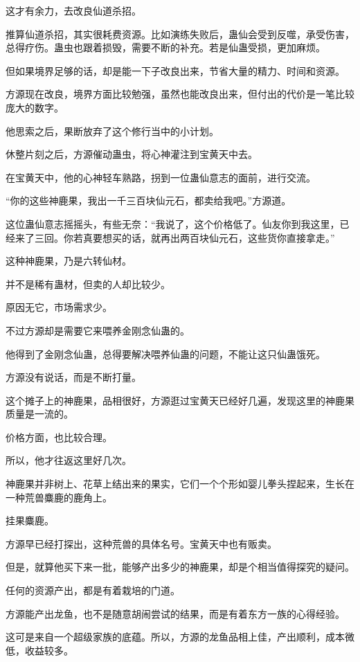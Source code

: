 \begin{this_body}
这才有余力，去改良仙道杀招。

推算仙道杀招，其实很耗费资源。比如演练失败后，蛊仙会受到反噬，承受伤害，总得疗伤。蛊虫也跟着损毁，需要不断的补充。若是仙蛊受损，更加麻烦。

但如果境界足够的话，却是能一下子改良出来，节省大量的精力、时间和资源。

方源现在改良，境界方面比较勉强，虽然也能改良出来，但付出的代价是一笔比较庞大的数字。

他思索之后，果断放弃了这个修行当中的小计划。

休整片刻之后，方源催动蛊虫，将心神灌注到宝黄天中去。

在宝黄天中，他的心神轻车熟路，拐到一位蛊仙意志的面前，进行交流。

“你的这些神鹿果，我出一千三百块仙元石，都卖给我吧。”方源道。

这位蛊仙意志摇摇头，有些无奈：“我说了，这个价格低了。仙友你到我这里，已经来了三回。你若真要想买的话，就再出两百块仙元石，这些货你直接拿走。”

这种神鹿果，乃是六转仙材。

并不是稀有蛊材，但卖的人却比较少。

原因无它，市场需求少。

不过方源却是需要它来喂养金刚念仙蛊的。

他得到了金刚念仙蛊，总得要解决喂养仙蛊的问题，不能让这只仙蛊饿死。

方源没有说话，而是不断打量。

这个摊子上的神鹿果，品相很好，方源逛过宝黄天已经好几遍，发现这里的神鹿果质量是一流的。

价格方面，也比较合理。

所以，他才往返这里好几次。

神鹿果并非树上、花草上结出来的果实，它们一个个形如婴儿拳头捏起来，生长在一种荒兽麋鹿的鹿角上。

挂果麋鹿。

方源早已经打探出，这种荒兽的具体名号。宝黄天中也有贩卖。

但是，就算他买下来一批，能够产出多少的神鹿果，却是个相当值得探究的疑问。

任何的资源产出，都是有着栽培的门道。

方源能产出龙鱼，也不是随意胡闹尝试的结果，而是有着东方一族的心得经验。

这可是来自一个超级家族的底蕴。所以，方源的龙鱼品相上佳，产出顺利，成本微低，收益较多。


\end{this_body}
